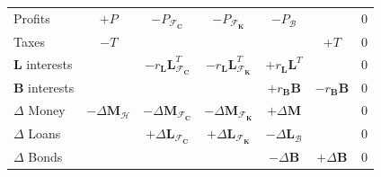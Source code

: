 \documentclass[]{beamer}
\begin{document}
\begin{frame}
\begin{table}
\begin{tabular}{l|ccccc|l}
			Profits                & $+P$                            & $-P_{\mathcal{F}_\mathbf{C}}$                                                                               & $-P_{\mathcal{F}_\mathbf{K}}$                                                                               & $-P_\mathcal{B}$                                          &                     & 0        \\
			Taxes                  &
			$-T$                   &                                 &                                                                                                             &                                                                                                             & $+T$                                                      & 0                              \\
			\midrule
			$\mathbf{L}$ interests &                                 & $-r_\mathbf{L} \mathbf{L}^T_{\mathcal{F}_\mathbf{C}}$ & $-r_\mathbf{L} \mathbf{L}^T_{\mathcal{F}_\mathbf{K}}$ & $+r_\mathbf{L} \mathbf{L}^T$ &                     & 0        \\
			$\mathbf{B}$ interests &
			&                                 &                                                                                                             & $+r_\mathbf{B}\mathbf{B}$                                                                                   & $-r_\mathbf{B}\mathbf{B}$                                 & 0                              \\
			\midrule
			$\Delta$ Money         & $-\Delta\mathbf{M}_\mathcal{H}$ & $-\Delta\mathbf{M}_{\mathcal{F}_\mathbf{C}}$                                                                & $-\Delta\mathbf{M}_{\mathcal{F}_\mathbf{K}}$                                                                & $+\Delta\mathbf{M}$                                       &                     & 0        \\
			$\Delta$ Loans         &                                 & $+\Delta\mathbf{L}_{\mathcal{F}_\mathbf{C}}$                                                                & $+\Delta\mathbf{L}_{\mathcal{F}_\mathbf{K}}$                                                                & $-\Delta\mathbf{L}_{\mathcal{B}}$                         &                     & 0        \\
			$\Delta$ Bonds         &                                 &                                                                                                             &                                                                                                             & $-\Delta\mathbf{B}$                                       & $+\Delta\mathbf{B}$ & 0        \\

\end{tabular}
\end{table}
\end{frame}
\end{document}
